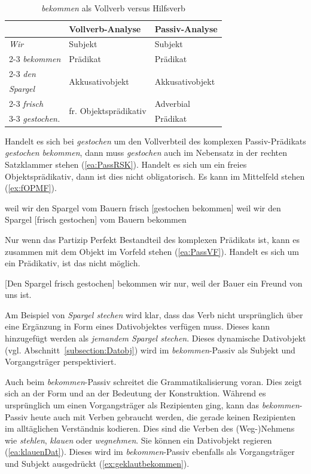 \begin{table}
  \centering
  \begin{tabular}{l|l|l}
    & Vollverb-Analyse & Passiv-Analyse \\
    \hline
    \textit{Wir} & Subjekt & Subjekt\\
    \cline{2-3} 
    \textit{bekommen} & Prädikat & Prädikat \\
    \cline{2-3}
    \textit{den} & \multirow{2}{*}{Akkusativobjekt} & \multirow{2}{*}{Akkusativobjekt} \\
    \textit{Spargel} & &\\ \cline{2-3}
    \textit{frisch} & \multirow{2}{*}{fr. Objektsprädikativ} & Adverbial \\ \cline{3-3}
    \textit{gestochen.} &  & Prädikat  \\
    \hline 
  \end{tabular}
  \caption{\textit{bekommen} als Vollverb versus Hilfsverb}
  \label{tab:bekommenVVvsPassiv}
\end{table}


Handelt es sich bei \textit{gestochen} um den Vollverbteil des komplexen Passiv-Prädikats \textit{gestochen bekommen}, dann muss \textit{gestochen} auch im Nebensatz in der rechten Satzklammer stehen (\ref{ea:PassRSK}). Handelt es sich um ein freies Objektsprädikativ, dann ist dies nicht obligatorisch. Es kann im Mittelfeld stehen (\ref{ex:fOPMF}).

\ea \label{ea:StellungOPrädvsPass}
\ea \label{ea:PassRSK} weil wir den Spargel vom Bauern frisch [gestochen bekommen]
\ex \label{ex:fOPMF} weil wir den Spargel [frisch gestochen] vom Bauern bekommen
\z 
\z 

Nur wenn das Partizip Perfekt Bestandteil des komplexen Prädikats ist, kann es zusammen mit dem Objekt im Vorfeld stehen (\ref{ea:PassVF}). Handelt es sich um ein Prädikativ, ist das nicht möglich.

\ea \label{ea:PassVF} [Den Spargel frisch gestochen] bekommen wir nur, weil der Bauer ein Freund von uns ist. 
\z 

Am Beispiel von \textit{Spargel stechen} wird klar, dass das Verb nicht ursprünglich über eine Ergänzung in Form eines Dativobjektes verfügen muss. Dieses kann hinzugefügt werden als \textit{jemandem Spargel stechen}. Dieses dynamische Dativobjekt (vgl. Abschnitt~\ref{subsection:Datobj}) wird im \textit{bekommen}-Passiv als Subjekt und Vorgangsträger perspektiviert. 

Auch beim \textit{bekommen}-Passiv schreitet die Grammatikalisierung voran. Dies zeigt sich an der Form und an der Bedeutung der Konstruktion. Während es ursprünglich um einen Vorgangsträger als Rezipienten ging, kann das \textit{bekommen}-Passiv heute auch mit Verben gebraucht werden, die gerade keinen Rezipienten im alltäglichen Verständnis kodieren. Dies sind die Verben des (Weg-)Nehmens wie \textit{stehlen}, \textit{klauen} oder \textit{wegnehmen}. Sie können ein Dativobjekt regieren (\ref{ea:klauenDat}). Dieses wird im \textit{bekommen}-Passiv ebenfalls als Vorgangsträger und Subjekt ausgedrückt (\ref{ex:geklautbekommen}).

